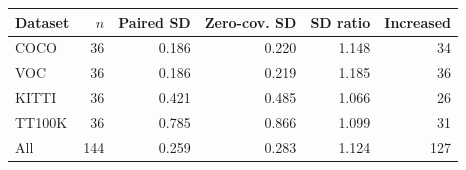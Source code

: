 \begin{tabular}{lrrrrr}
\toprule
Dataset & $n$ & Paired SD & Zero-cov. SD & SD ratio & Increased\\
\midrule
COCO & 36 & 0.186 & 0.220 & 1.148 & 34\\
VOC & 36 & 0.186 & 0.219 & 1.185 & 36\\
KITTI & 36 & 0.421 & 0.485 & 1.066 & 26\\
TT100K & 36 & 0.785 & 0.866 & 1.099 & 31\\
All & 144 & 0.259 & 0.283 & 1.124 & 127\\
\bottomrule
\end{tabular}
